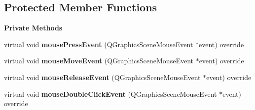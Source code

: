 \subsection*{Protected Member Functions}
\begin{Indent}\textbf{ Private Methods}\par
\begin{DoxyCompactItemize}
\item 
\mbox{\label{classrev_1_1_view_1_1_timeline_marker_aa70bc2c11a5c4fafa849f589ea797700}} 
virtual void {\bfseries mouse\+Press\+Event} (Q\+Graphics\+Scene\+Mouse\+Event $\ast$event) override
\item 
\mbox{\label{classrev_1_1_view_1_1_timeline_marker_a4b543a944e64c7fa44f2b28cfe25de32}} 
virtual void {\bfseries mouse\+Move\+Event} (Q\+Graphics\+Scene\+Mouse\+Event $\ast$event) override
\item 
\mbox{\label{classrev_1_1_view_1_1_timeline_marker_a0a87e42db28b2c570f1ecc331c959e56}} 
virtual void {\bfseries mouse\+Release\+Event} (Q\+Graphics\+Scene\+Mouse\+Event $\ast$event) override
\item 
\mbox{\label{classrev_1_1_view_1_1_timeline_marker_a789b0572ec60cd14fe08dc472fcfc507}} 
virtual void {\bfseries mouse\+Double\+Click\+Event} (Q\+Graphics\+Scene\+Mouse\+Event $\ast$event) override
\end{DoxyCompactItemize}
\end{Indent}
